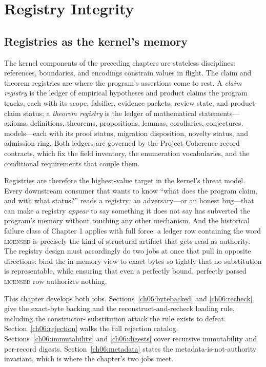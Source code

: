 \chapter{Registry Integrity}\label{ch06:registry}

\section{Registries as the kernel's memory}\label{ch06:role}

The kernel components of the preceding chapters are stateless disciplines:
references, boundaries, and encodings constrain values in flight. The claim
and theorem registries are where the program's assertions come to rest. A
\emph{claim registry} is the ledger of empirical hypotheses and product
claims the program tracks, each with its scope, falsifier, evidence
packets, review state, and product-claim status; a \emph{theorem registry}
is the ledger of mathematical statements---axioms, definitions, theorems,
propositions, lemmas, corollaries, conjectures, models---each with its
proof status, migration disposition, novelty status, and admission ring.
Both ledgers are governed by the Project Coherence record contracts, which
fix the field inventory, the enumeration vocabularies, and the conditional
requirements that couple them.

Registries are therefore the highest-value target in the kernel's threat
model. Every downstream consumer that wants to know ``what does the
program claim, and with what status?'' reads a registry; an adversary---or
an honest bug---that can make a registry \emph{appear} to say something it
does not say has subverted the program's memory without touching any other
mechanism. And the historical failure class of Chapter 1 applies with full
force: a ledger row containing the word \textsc{licensed} is precisely the
kind of structural artifact that gets read as authority. The registry
design must accordingly do two jobs at once that pull in opposite
directions: bind the in-memory view to exact bytes so tightly that no
substitution is representable, while ensuring that even a perfectly bound,
perfectly parsed \textsc{licensed} row authorizes nothing.

This chapter develops both jobs. Sections~\ref{ch06:bytebacked} and
\ref{ch06:recheck} give the exact-byte backing and the
reconstruct-and-recheck loading rule, including the constructor-
substitution attack the rule exists to defeat.
Section~\ref{ch06:rejection} walks the full rejection catalog.
Sections~\ref{ch06:immutability} and \ref{ch06:digests} cover recursive
immutability and per-record digests. Section~\ref{ch06:metadata} states
the metadata-is-not-authority invariant, which is where the chapter's two
jobs meet.

